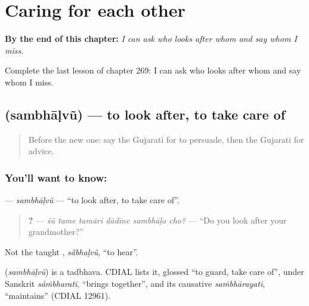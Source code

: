 
\chapter{Caring for each other}
\label{ch:gu-caring-for-each-other}

\begin{chapteropening}
\textbf{By the end of this chapter:} \emph{I can ask who looks after whom and say whom I miss.}

Complete the last lesson of chapter 269: I can ask who looks after whom and say whom I miss.
\end{chapteropening}

\section[\texorpdfstring{\gu{સંભાળવું} (sambhāḷvũ)}{સંભાળવું (sambhāḷvũ)}]{ (sambhāḷvũ) — to look after, to take care of}

\label{lesson:GU-C269-sambhalvu}



\begin{quote}
Before the new one: say the Gujarati for to persuade, then the Gujarati for advice.
\end{quote}

\subsection*{You'll want to know: }
\textbf{} — \emph{sambhāḷvũ} — \textquotedblleft{}to look after, to take care of\textquotedblright{}.

\begin{quote}
\textbf{     ?} — \emph{śũ tame tamārī dādīne sambhāḷo cho?} — \textquotedblleft{}Do you look after your grandmother?\textquotedblright{}
\end{quote}

Not the taught \textbf{}, \emph{sā̃bhaḷvũ}, \textquotedblleft{}to hear\textquotedblright{}.

\begin{cousinweb}
\textbf{} (\emph{sambhāḷvũ}) is a tadbhava. CDIAL lists it, glossed \textquotedblleft{}to guard, take care of\textquotedblright{}, under Sanskrit \emph{sáṁbharati}, \textquotedblleft{}brings together\textquotedblright{}, and its causative \emph{saṁbhārayati}, \textquotedblleft{}maintains\textquotedblright{} (CDIAL 12961).
\end{cousinweb}

